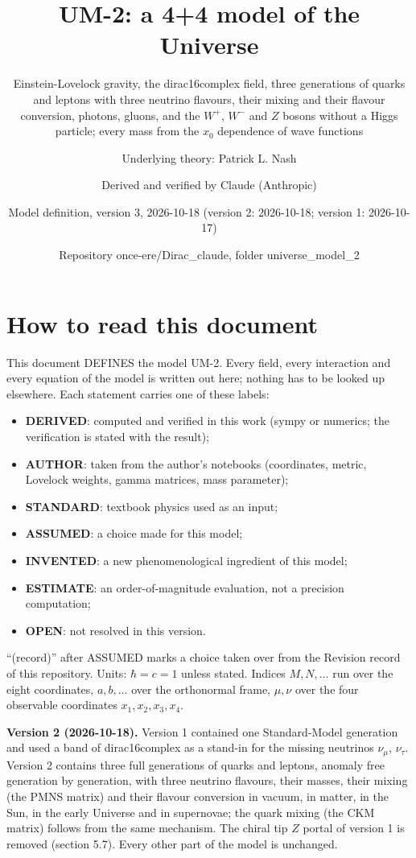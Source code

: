 \documentclass[
  10pt,
]{article}
\title{UM-2: a 4+4 model of the Universe}
\subtitle{Einstein-Lovelock gravity, the dirac16complex field, three
generations of quarks and leptons with three neutrino flavours, their
mixing and their flavour conversion, photons, gluons, and the \(W^+\),
\(W^-\) and \(Z\) bosons without a Higgs particle; every mass from the
\(x_0\) dependence of wave functions}
\author{Underlying theory: Patrick L. Nash \and Derived and verified by
Claude (Anthropic) \and Model definition, version 3, 2026-10-18 (version
2: 2026-10-18; version 1: 2026-10-17) \and Repository
once-ere/Dirac\_claude, folder universe\_model\_2}
\date{}
\providecommand{\tightlist}{%
  \setlength{\itemsep}{0pt}\setlength{\parskip}{0pt}}
\begin{document}
\maketitle

{
\hypersetup{linkcolor=}
\setcounter{tocdepth}{3}
\tableofcontents
}
\hypertarget{how-to-read-this-document}{%
\section{How to read this document}\label{how-to-read-this-document}}

This document DEFINES the model UM-2. Every field, every interaction and
every equation of the model is written out here; nothing has to be
looked up elsewhere. Each statement carries one of these labels:

\begin{itemize}
\tightlist
\item
  \textbf{DERIVED}: computed and verified in this work (sympy or
  numerics; the verification is stated with the result);
\item
  \textbf{AUTHOR}: taken from the author's notebooks (coordinates,
  metric, Lovelock weights, gamma matrices, mass parameter);
\item
  \textbf{STANDARD}: textbook physics used as an input;
\item
  \textbf{ASSUMED}: a choice made for this model;
\item
  \textbf{INVENTED}: a new phenomenological ingredient of this model;
\item
  \textbf{ESTIMATE}: an order-of-magnitude evaluation, not a precision
  computation;
\item
  \textbf{OPEN}: not resolved in this version.
\end{itemize}

``(record)'' after ASSUMED marks a choice taken over from the Revision
record of this repository. Units: \(\hbar = c = 1\) unless stated.
Indices \(M, N, \dots\) run over the eight coordinates, \(a, b, \dots\)
over the orthonormal frame, \(\mu, \nu\) over the four observable
coordinates \(x_1, x_2, x_3, x_4\).

\textbf{Version 2 (2026-10-18).} Version 1 contained one Standard-Model
generation and used a band of dirac16complex as a stand-in for the
missing neutrinos \(\nu_\mu\), \(\nu_\tau\). Version 2 contains three
full generations of quarks and leptons, anomaly free generation by
generation, with three neutrino flavours, their masses, their mixing
(the PMNS matrix) and their flavour conversion in vacuum, in matter, in
the Sun, in the early Universe and in supernovae; the quark mixing (the
CKM matrix) follows from the same mechanism. The chiral tip \(Z\) portal
of version 1 is removed (section 5.7). Every other part of the model is
unchanged.
\end{document}
